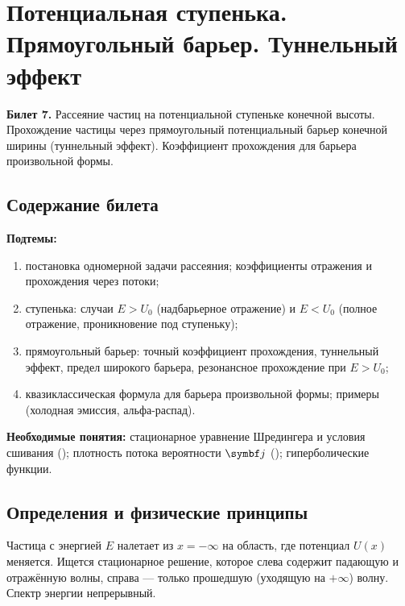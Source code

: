\chapter[Потенциальная ступенька. Туннельный эффект]%
        {Потенциальная ступенька. Прямоугольный барьер. Туннельный эффект}
\label{t:07}

\begin{qbox}
\textbf{Билет 7.} Рассеяние частиц на потенциальной ступеньке конечной высоты. Прохождение
частицы через прямоугольный потенциальный барьер конечной ширины (туннельный эффект).
Коэффициент прохождения для барьера произвольной формы.
\end{qbox}

\section{Содержание билета}

\textbf{Подтемы:}
\begin{enumerate}
 \item постановка одномерной задачи рассеяния; коэффициенты отражения и прохождения через потоки;
 \item ступенька: случаи $E>U_0$ (надбарьерное отражение) и $E<U_0$ (полное отражение, проникновение под ступеньку);
 \item прямоугольный барьер: точный коэффициент прохождения, туннельный эффект, предел широкого барьера, резонансное прохождение при $E>U_0$;
 \item квазиклассическая формула для барьера произвольной формы; примеры (холодная эмиссия, альфа-распад).
\end{enumerate}

\textbf{Необходимые понятия:} стационарное уравнение Шредингера и условия сшивания
(); плотность потока вероятности $\vect j$ (); гиперболические функции.

\section{Определения и физические принципы}

\begin{definition}
Частица с энергией $E$ налетает из $x=-\infty$ на область, где потенциал $U(x)$ меняется.
Ищется стационарное решение, которое слева содержит падающую и отражённую волны, справа —
только прошедшую (уходящую на $+\infty$) волну. Спектр энергии непрерывный.
\end{definition}

